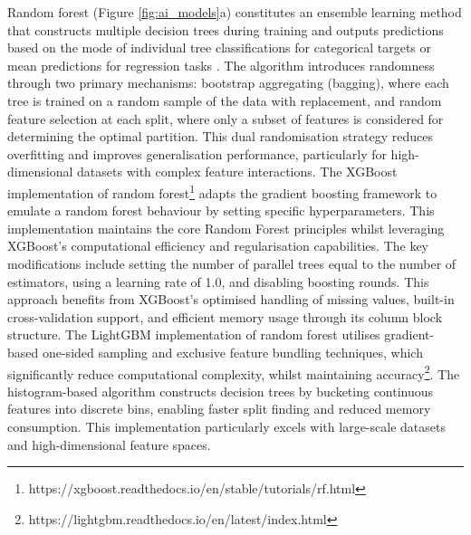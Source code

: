 Random  forest (Figure \ref{fig:ai_models}a) constitutes an ensemble learning method that constructs multiple decision trees during training and outputs predictions based on the mode of individual tree classifications for categorical targets or mean predictions for regression tasks \citep{Liu_2012}. The algorithm introduces randomness through two primary mechanisms: bootstrap aggregating (bagging), where each tree is trained on a random sample of the data with replacement, and random feature selection at each split, where only a subset of features is considered for determining the optimal partition. This dual randomisation strategy reduces overfitting and improves generalisation performance, particularly for high-dimensional datasets with complex feature interactions. The XGBoost implementation of random forest\footnote{https://xgboost.readthedocs.io/en/stable/tutorials/rf.html} adapts the gradient boosting framework to emulate a random forest behaviour by setting specific hyperparameters. This implementation maintains the core Random Forest principles whilst leveraging XGBoost's computational efficiency and regularisation capabilities. The key modifications include setting the number of parallel trees equal to the number of estimators, using a learning rate of 1.0, and disabling boosting rounds. This approach benefits from XGBoost's optimised handling of missing values, built-in cross-validation support, and efficient memory usage through its column block structure. The LightGBM implementation of random forest utilises gradient-based one-sided sampling and exclusive feature bundling techniques, which significantly reduce computational complexity, whilst maintaining accuracy\footnote{https://lightgbm.readthedocs.io/en/latest/index.html}. The histogram-based algorithm constructs decision trees by bucketing continuous features into discrete bins, enabling faster split finding and reduced memory consumption. This implementation particularly excels with large-scale datasets and high-dimensional feature spaces.

